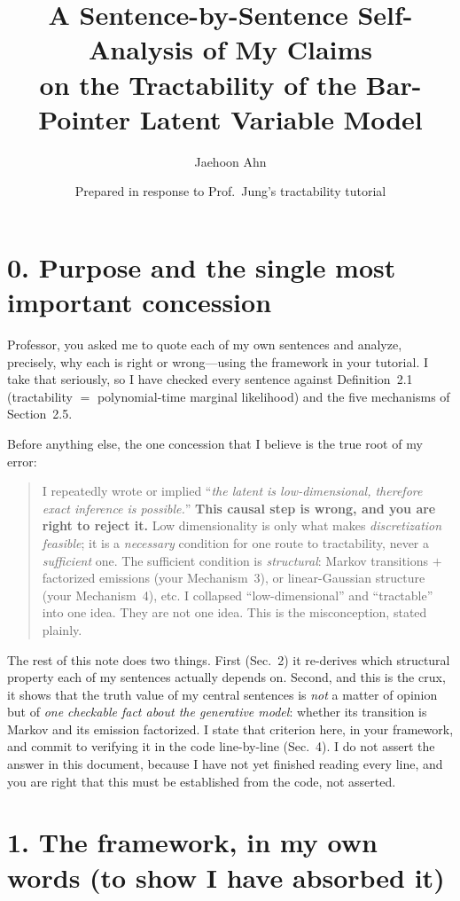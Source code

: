 \documentclass[11pt]{article}
\title{A Sentence-by-Sentence Self-Analysis of My Claims\\
on the Tractability of the Bar-Pointer Latent Variable Model}
\author{Jaehoon Ahn}
\date{Prepared in response to Prof.\ Jung's tractability tutorial}
\begin{document}
\maketitle

\section*{0. Purpose and the single most important concession}

Professor, you asked me to quote each of my own sentences and analyze, precisely, why each is
right or wrong---using the framework in your tutorial. I take that seriously, so I have checked
every sentence against Definition~2.1 (tractability $=$ polynomial-time marginal likelihood) and
the five mechanisms of Section~2.5.

Before anything else, the one concession that I believe is the true root of my error:

\begin{quote}
I repeatedly wrote or implied ``\emph{the latent is low-dimensional, therefore exact inference is
possible.}'' \textbf{This causal step is wrong, and you are right to reject it.} Low dimensionality
is only what makes \emph{discretization feasible}; it is a \emph{necessary} condition for one route
to tractability, never a \emph{sufficient} one. The sufficient condition is \emph{structural}:
Markov transitions $+$ factorized emissions (your Mechanism~3), or linear-Gaussian structure (your
Mechanism~4), etc. I collapsed ``low-dimensional'' and ``tractable'' into one idea. They are not one
idea. This is the misconception, stated plainly.
\end{quote}

The rest of this note does two things. First (Sec.~2) it re-derives which structural property each
of my sentences actually depends on. Second, and this is the crux, it shows that the truth value of
my central sentences is \emph{not} a matter of opinion but of \emph{one checkable fact about the
generative model}: whether its transition is Markov and its emission factorized. I state that
criterion here, in your framework, and commit to verifying it in the code line-by-line (Sec.~4). I
do not assert the answer in this document, because I have not yet finished reading every line, and
you are right that this must be established from the code, not asserted.

\section*{1. The framework, in my own words (to show I have absorbed it)}
\end{document}

